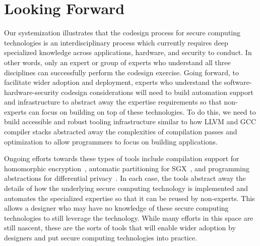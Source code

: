 \section{Looking Forward}

\label{sec:future-work}

Our systemization illustrates that the codesign process for secure computing technologies is an interdisciplinary process which currently requires deep specialized knowledge across applications, hardware, and security to conduct.
In other words, only an expert or group of experts who understand all three disciplines can successfully perform the codesign exercise.
Going forward, to facilitate wider adoption and deployment, experts who understand the software-hardware-security codesign considerations will need to build automation support and infrastructure to abstract away the expertise requirements so that non-experts can focus on building on top of these technologies.
To do this, we need to build accessible and robust tooling infrastructure similar to how LLVM and GCC compiler stacks abstracted away the complexities of compilation passes and optimization to allow programmers to focus on building applications.

Ongoing efforts towards these types of tools include compilation support for homomorphic encryption~\cite{chet, eva}, automatic partitioning for SGX~\cite{lind2017glamdring}, and programming abstractions for differential privacy~\cite{barthe2016programming, mcsherry2009privacy, roy2010airavat}.
In each case, the tools abstract away the details of how the underlying secure computing technology is implemented and automates the specialized expertise so that it can be reused by non-experts.
This allows a designer who may have no knowledge of these secure computing technologies to still leverage the technology.
While many efforts in this space are still nascent, these are the sorts of tools that will enable wider adoption by designers and put secure computing technologies into practice.
